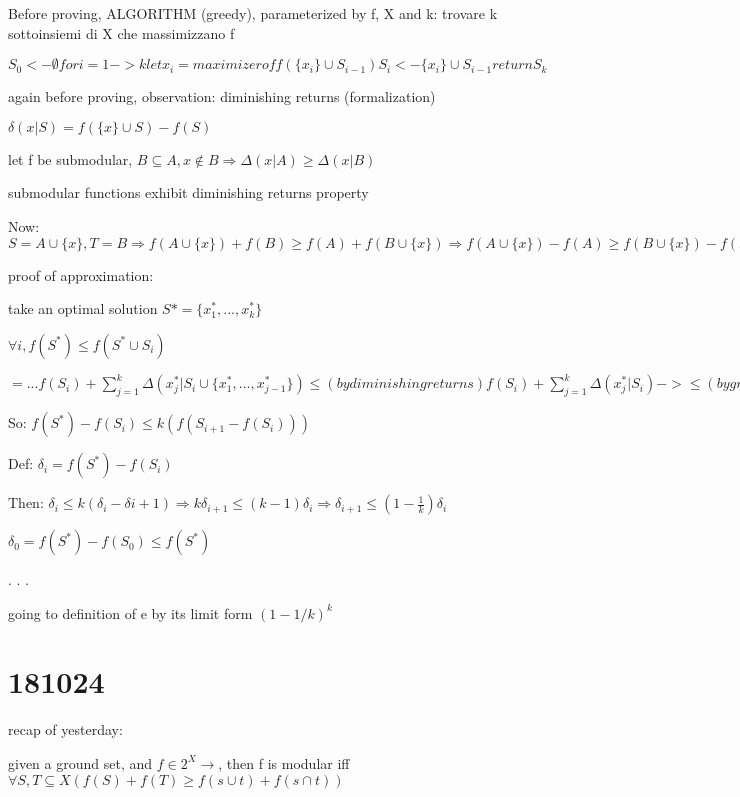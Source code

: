 \documentclass{report}
\begin{document}
	
	Before proving, ALGORITHM (greedy), parameterized by f, X and k: trovare k sottoinsiemi di X che massimizzano f
	
	$
	S_0 <- \emptyset
	for i=1 -> k
		let x_i = maximizer of f(\{x_i\} \cup S_{i-1})
		S_i <- \{x_i\} \cup S_{i-1}		
	return S_k
	$
	
	again before proving, observation: diminishing returns (formalization)
	
	$\delta(x|S) = f(\{x\}\cup S) - f(S)$ %
	
	let f be submodular, $B \subseteq A, x \notin B \Rightarrow \Delta(x|A) \geq \Delta(x|B)$ %
	
	submodular functions exhibit diminishing returns property
	
	Now: $S=A\cup\{x\}, T=B \Rightarrow f(A\cup\{x\})+f(B)\geq f(A)+f(B\cup\{x\}) \Rightarrow f(A\cup\{x\})-f(A)\geq f(B\cup\{x\})-f(B) \Rightarrow \Delta(x|A) \geq \Delta(x|B)$
	
	proof of approximation:
	
	take an optimal solution $S*=\{x_1^*, ..., x_k^*\}$
	
	$\forall i, f(S^*) \leq f(S^* \cup S_i)$ %
	
	$ = ... f(S_i) + \sum_{j=1}^{k}\Delta(x_j^*|S_i\cup \{x_1^*, ..., x_{j-1}^*\}) \leq (bydiminishingreturns) f(S_i) + \sum_{j=1}^{k}\Delta(x_j^*|S_i) -> \leq (bygreediness) f(S_i) + \sum_{j=1}^{k}\Delta(x_{i+1}|S_i) = f(S_i) + k(f(S_i \cup \{x_{i+1}\})-f(S_i)) = kf(S_{i+1}) - (k-1)f(S_i)$
	
	
	So: $f(S^*) - f(S_i) \leq k(f(S_{i+1} - f(S_i)))$
	
	Def: $\delta_i = f(S^*) - f(S_i)$
	
	Then: $\delta_i \leq k(\delta_i - \delta{i+1}) \Rightarrow k\delta_{i+1} \leq (k-1)\delta_i \Rightarrow \delta_{i+1} \leq (1-\frac{1}{k})\delta_i$
	
	$\delta_0 = f(S^*)-f(S_0) \leq f(S^*)$ %
	
	
	.
	.
	.
	
	going to definition of e by its limit form $(1-1/k)^k$
	
	
	\section{181024}
	
	recap of yesterday:
	
	given a ground set, and $f \in 2^X \to \mathbb{}$, then f is modular iff $\forall S, T \subseteq X (f(S)+f(T) \geq f(s\cup t) + f(s \cap t))$
	
\end{document}
